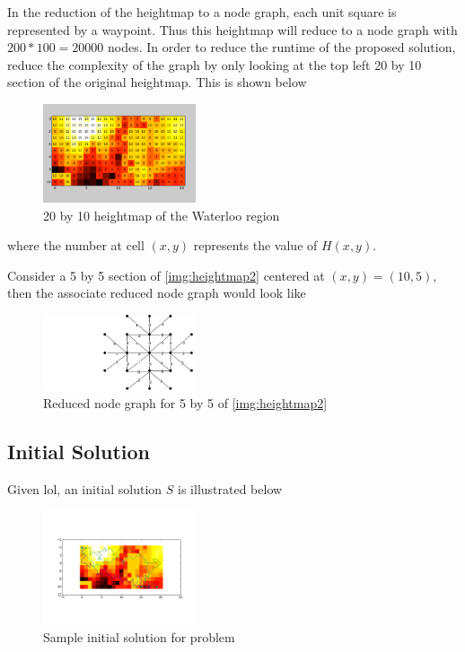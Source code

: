 \documentclass[conference]{IEEEtran}
\begin{document}
In the reduction of the heightmap to a node graph, each unit square is represented by a waypoint. Thus this heightmap will reduce to a node graph with $200 * 100 = 20000$ nodes. In order to reduce the runtime of the proposed solution, reduce the complexity of the graph by only looking at the top left 20 by 10 section of the original heightmap. This is shown below
\begin{figure}[htbp] \label{img:heightmap2}
\centerline{\includegraphics[width=0.4\textwidth]{images/heightmap.png}}
\caption{20 by 10 heightmap of the Waterloo region}
\label{fig}
\end{figure}
where the number at cell $(x, y)$ represents the value of $H(x, y)$.

Consider a 5 by 5 section of \ref{img:heightmap2} centered at $(x, y) = (10, 5)$, then the associate reduced node graph would look like
\begin{figure}[htbp] \label{img:nodegraph5}
\centerline{\includegraphics[width=0.4\textwidth]{images/nodegraph5.png}}
\caption{Reduced node graph for 5 by 5 of \ref{img:heightmap2}}
\label{fig}
\end{figure}

\subsection{Initial Solution}
Given lol, an initial solution $S$ is illustrated below
\begin{figure}[htbp] \label{img:solution_aco}
\centerline{\includegraphics[width=0.4\textwidth]{images/solution_aco.png}}
\caption{Sample initial solution for problem}
\label{fig}
\end{figure}
\end{document}
